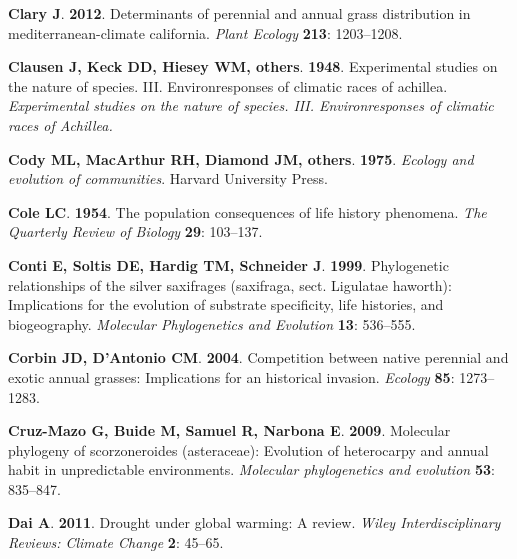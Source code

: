 \documentclass[man,floatsintext]{apa6}
\theoremstyle{definition}
\theoremstyle{definition}
\theoremstyle{definition}
\theoremstyle{remark}
\begin{document}
\leavevmode\hypertarget{ref-clary2012determinants}{}%
\textbf{\textnormal{Clary J}}. \textbf{2012}. Determinants of perennial
and annual grass distribution in mediterranean-climate california.
\emph{Plant Ecology} \textbf{213}: 1203--1208.

\leavevmode\hypertarget{ref-clausen1948experimental}{}%
\textbf{\textnormal{Clausen J}, \textnormal{Keck DD}, \textnormal{Hiesey
WM}, \textnormal{others}}. \textbf{1948}. Experimental studies on the
nature of species. III. Environresponses of climatic races of achillea.
\emph{Experimental studies on the nature of species. III.
Environresponses of climatic races of Achillea.}

\leavevmode\hypertarget{ref-cody1975ecology}{}%
\textbf{\textnormal{Cody ML}, \textnormal{MacArthur RH},
\textnormal{Diamond JM}, \textnormal{others}}. \textbf{1975}.
\emph{Ecology and evolution of communities}. Harvard University Press.

\leavevmode\hypertarget{ref-cole1954population}{}%
\textbf{\textnormal{Cole LC}}. \textbf{1954}. The population
consequences of life history phenomena. \emph{The Quarterly Review of
Biology} \textbf{29}: 103--137.

\leavevmode\hypertarget{ref-conti1999phylogenetic}{}%
\textbf{\textnormal{Conti E}, \textnormal{Soltis DE}, \textnormal{Hardig
TM}, \textnormal{Schneider J}}. \textbf{1999}. Phylogenetic
relationships of the silver saxifrages (saxifraga, sect. Ligulatae
haworth): Implications for the evolution of substrate specificity, life
histories, and biogeography. \emph{Molecular Phylogenetics and
Evolution} \textbf{13}: 536--555.

\leavevmode\hypertarget{ref-corbin2004competition}{}%
\textbf{\textnormal{Corbin JD}, \textnormal{D'Antonio CM}}.
\textbf{2004}. Competition between native perennial and exotic annual
grasses: Implications for an historical invasion. \emph{Ecology}
\textbf{85}: 1273--1283.

\leavevmode\hypertarget{ref-cruz2009molecular}{}%
\textbf{\textnormal{Cruz-Mazo G}, \textnormal{Buide M},
\textnormal{Samuel R}, \textnormal{Narbona E}}. \textbf{2009}. Molecular
phylogeny of scorzoneroides (asteraceae): Evolution of heterocarpy and
annual habit in unpredictable environments. \emph{Molecular
phylogenetics and evolution} \textbf{53}: 835--847.

\leavevmode\hypertarget{ref-dai2011drought}{}%
\textbf{\textnormal{Dai A}}. \textbf{2011}. Drought under global
warming: A review. \emph{Wiley Interdisciplinary Reviews: Climate
Change} \textbf{2}: 45--65.
\end{document}
